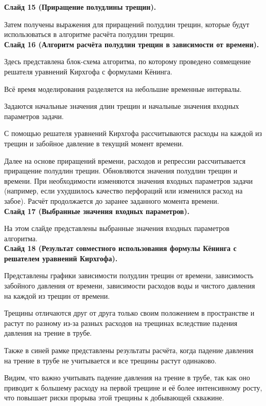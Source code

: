 \documentclass[a4paper, 12pt]{article}
\begin{document}
\textbf{Слайд 15 (Приращение полудлины трещин).}

Затем получены выражения для приращений полудлин трещин, которые будут использоваться в алгоритме расчёта полудлин трещин.
\\


\textbf{Слайд 16 (Алгоритм расчёта полудлин трещин в зависимости от времени).}

Здесь представлена блок-схема алгоритма, по которому проведено совмещение решателя уравнений Кирхгофа с формулами Кёнинга.

Всё время моделирования разделяется на небольшие временные интервалы.

Задаются начальные значения длин трещин и начальные значения входных параметров задачи.

С помощью решателя уравнений Кирхгофа рассчитываются расходы на каждой из трещин и забойное давление в текущий момент времени.

Далее на основе приращений времени, расходов и репрессии рассчитывается приращение полудлин трещин.
Обновляются значения полудлин трещин и времени.
При необходимости изменяются значения входных параметров задачи (например, если ухудшилось качество перфораций или изменился расход на забое).
Расчёт продолжается до заранее заданного момента времени.
\\

\textbf{Слайд 17 (Выбранные значения входных параметров).}

На этом слайде представлены выбранные значения входных параметров алгоритма.
\\


\textbf{Слайд 18 (Результат совместного использования формулы Кёнинга с решателем уравнений Кирхгофа).}

Представлены графики зависимости полудлин трещин от времени, зависимость забойного давления от времени, зависимости расходов воды и чистого давления на каждой из трещин от времени.

Трещины отличаются друг от друга только своим положением в пространстве и растут по разному из-за разных расходов на трещинах вследствие падения давления на трение в трубе.

Также в синей рамке представлены результаты расчёта, когда падение давления на трение в трубе не учитывается и все трещины растут одинаково.

Видим, что важно учитывать падение давления на трение в трубе, так как оно приводит к большему расходу на первой трещине и её более интенсивному росту, что повышает риски прорыва этой трещины к добывающей скважине.
\\
\end{document}
